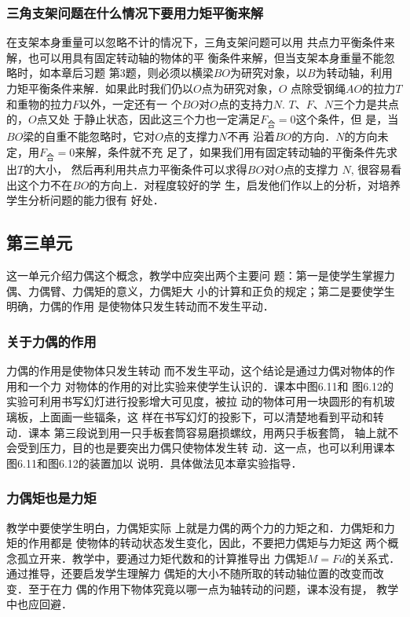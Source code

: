 \subsubsection{三角支架问题在什么情况下要用力矩平衡来解}

在支架本身重量可以忽略不计的情况下，三角支架问题可以用
共点力平衡条件来解，也可以用具有固定转动轴的物体的平
衡条件来解，但当支架本身重量不能忽略时，如本章后习题
第3题，则必须以横梁$BO$为研究对象，以$B$为转动轴，利用
力矩平衡条件来解．如果此时我们仍以$O$点为研究对象，$O$
点除受钢绳$AO$的拉力$T$和重物的拉力$F$以外，一定还有一
个$BO$对$O$点的支持力$N$. $T$、$F$、$N$三个力是共点的，$O$点又处
于静止状态，因此这三个力也一定满足$F_{\text{合}}=0$这个条件，但
是，当$BO$梁的自重不能忽略时，它对$O$点的支撑力$N$不再
沿着$BO$的方向．$N$的方向未定，用$F_{\text{合}}=0$来解，条件就不充
足了，如果我们用有固定转动轴的平衡条件先求出$T$的大小，
然后再利用共点力平衡条件可以求得$BO$对$O$点的支撑力
$N$, 很容易看出这个力不在$BO$的方向上．对程度较好的学
生，启发他们作以上的分析，对培养学生分析问题的能力很有
好处．


\subsection{第三单元}
这一单元介绍力偶这个概念，教学中应突出两个主要问
题：第一是使学生掌握力偶、力偶臂、力偶矩的意义，力偶矩大
小的计算和正负的规定；第二是要使学生明确，力偶的作用
是使物体只发生转动而不发生平动．
\subsubsection{关于力偶的作用}

力偶的作用是使物体只发生转动
而不发生平动，这个结论是通过力偶对物体的作用和一个力
对物体的作用的对比实验来使学生认识的．课本中图6.11和
图6.12的实验可利用书写幻灯进行投影增大可见度，被拉
动的物体可用一块圆形的有机玻璃板，上面画一些辐条，这
样在书写幻灯的投影下，可以清楚地看到平动和转动．课本
第三段说到用一只手板套筒容易磨损螺纹，用两只手板套筒，
轴上就不会受到压力，目的也是要突出力偶只使物体发生转
动．这一点，也可以利用课本图6.11和图6.12的装置加以
说明．具体做法见本章实验指导．

\subsubsection{力偶矩也是力矩}

教学中要使学生明白，力偶矩实际
上就是力偶的两个力的力矩之和．力偶矩和力矩的作用都是
使物体的转动状态发生变化，因此，不要把力偶矩与力矩这
两个概念孤立开来．教学中，要通过力矩代数和的计算推导出
力偶矩$M=Fd$的关系式．通过推导，还要启发学生理解力
偶矩的大小不随所取的转动轴位置的改变而改变．至于在力
偶的作用下物体究竟以哪一点为轴转动的问题，课本没有提，
教学中也应回避．


